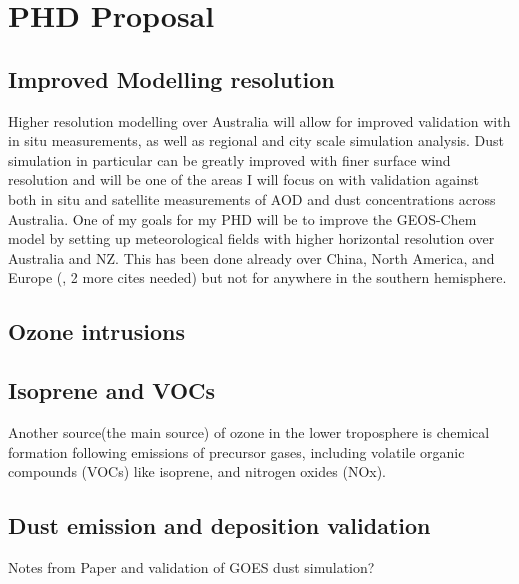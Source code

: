 \section{PHD Proposal}

\subsection{Improved Modelling resolution}
Higher resolution modelling over Australia will allow for improved validation with in situ measurements, as well as regional and city scale simulation analysis. 
Dust simulation in particular can be greatly improved with finer surface wind resolution and will be one of the areas I will focus on with validation against both in situ and satellite measurements of AOD and dust concentrations across Australia.
One of my goals for my PHD will be to improve the GEOS-Chem model by setting up meteorological fields with higher horizontal resolution over Australia and NZ.
This has been done already over China, North America, and Europe (\cite{Chen_2009}, 2 more cites needed) but not for anywhere in the southern hemisphere.

\subsection{Ozone intrusions}

\subsection{Isoprene and VOCs}
Another source(the main source) of ozone in the lower troposphere is chemical formation following emissions of precursor gases, including volatile organic compounds (VOCs) like isoprene, and nitrogen oxides (NOx).

\subsection{Dust emission and deposition validation}
Notes from Paper and validation of GOES dust simulation?
